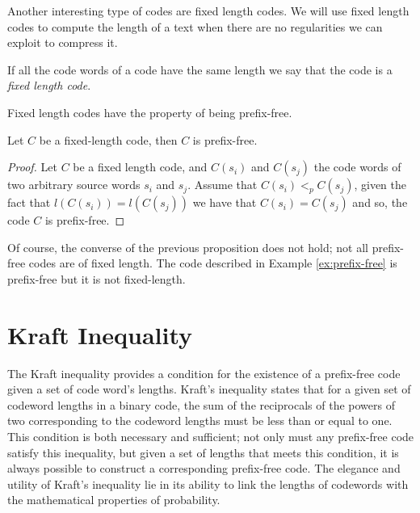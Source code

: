 Another interesting type of codes are fixed length codes. We will use fixed length codes to compute the length of a text when there are no regularities we can exploit to compress it.

\begin{definition}
\label{def:Fixed-Length-Codes}
If all the code words of a code have the same length we say that the code is a \emph{fixed length code}.
\end{definition}

Fixed length codes have the property of being prefix-free.

\begin{proposition}
Let $C$ be a fixed-length code, then $C$ is prefix-free.
\end{proposition}
\begin{proof}
Let $C$ be a fixed length code, and $C(s_i)$ and $C(s_j)$ the code words of two arbitrary source words $s_i$ and $s_j$. Assume that $C(s_i) <_p C(s_j)$, given the fact that $l(C(s_i)) = l(C(s_j))$ we have that $C(s_i) = C(s_j)$ and so, the code $C$ is prefix-free.
\end{proof}

Of course, the converse of the previous proposition does not hold; not all prefix-free codes are of fixed length. The code described in Example \ref{ex:prefix-free} is prefix-free but it is not fixed-length.

%
%

\section{Kraft Inequality}

The Kraft inequality provides a condition for the existence of a prefix-free code given a set of code word's lengths. Kraft's inequality states that for a given set of codeword lengths in a binary code, the sum of the reciprocals of the powers of two corresponding to the codeword lengths must be less than or equal to one. This condition is both necessary and sufficient; not only must any prefix-free code satisfy this inequality, but given a set of lengths that meets this condition, it is always possible to construct a corresponding prefix-free code. The elegance and utility of Kraft's inequality lie in its ability to link the lengths of codewords with the mathematical properties of probability.

